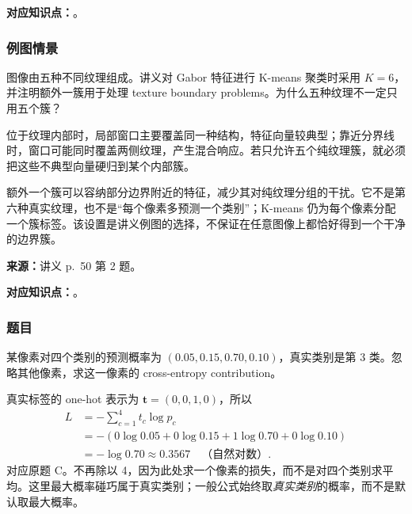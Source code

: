 \textbf{对应知识点：}。

\subsubsection*{例图情景}

图像由五种不同纹理组成。讲义对 Gabor 特征进行 K-means 聚类时采用 $K=6$，并注明额外一簇用于处理 texture boundary problems。为什么五种纹理不一定只用五个簇？

\begin{checkedsolution}
位于纹理内部时，局部窗口主要覆盖同一种结构，特征向量较典型；靠近分界线时，窗口可能同时覆盖两侧纹理，产生混合响应。若只允许五个纯纹理簇，就必须把这些不典型向量硬归到某个内部簇。

额外一个簇可以容纳部分边界附近的特征，减少其对纯纹理分组的干扰。它不是第六种真实纹理，也不是“每个像素多预测一个类别”；K-means 仍为每个像素分配一个簇标签。该设置是讲义例图的选择，不保证在任意图像上都恰好得到一个干净的边界簇。
\end{checkedsolution}

\noindent\begin{minipage}{\linewidth}

\textbf{来源：}讲义 p.~50 第 2 题。

\textbf{对应知识点：}。

\subsubsection*{题目}

某像素对四个类别的预测概率为 $(0.05,0.15,0.70,0.10)$，真实类别是第 3 类。忽略其他像素，求这一像素的 cross-entropy contribution。
\end{minipage}\par

\begin{checkedsolution}
真实标签的 one-hot 表示为 $\bm t=(0,0,1,0)$，所以
\[
\begin{aligned}
  L&=-\sum_{c=1}^4 t_c\log p_c\\
   &=-(0\log0.05+0\log0.15+1\log0.70+0\log0.10)\\
   &=\boxed{-\log0.70}\approx0.3567\quad\text{（自然对数）}.
\end{aligned}
\]
对应原题 C。不再除以 4，因为此处求一个像素的损失，而不是对四个类别求平均。这里最大概率碰巧属于真实类别；一般公式始终取\emph{真实类别}的概率，而不是默认取最大概率。
\end{checkedsolution}
